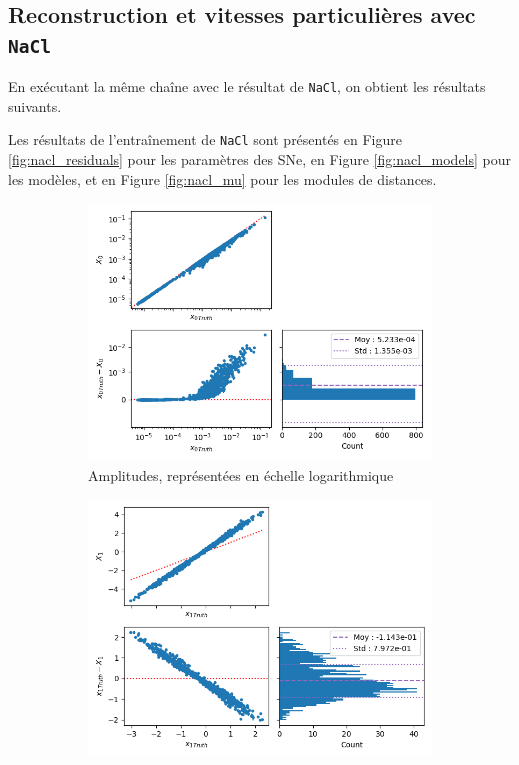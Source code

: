 \documentclass{book}
\def\nacl{\texttt{NaCl}\xspace}
\begin{document}
\subsection{Reconstruction et vitesses particulières avec \nacl}
En exécutant la même chaîne avec le résultat de \nacl, on obtient les résultats suivants.

Les résultats de l'entraînement de \nacl sont présentés en Figure \ref{fig:nacl_residuals} pour les paramètres des SNe, en Figure \ref{fig:nacl_models} pour les modèles, et en Figure \ref{fig:nacl_mu} pour les modules de distances.

\begin{figure}
	\centering
	\begin{subfigure}{0.45\textwidth}
		\centering
		\includegraphics[width=\textwidth]{figures/nacl_x0.png}
		\caption{Amplitudes, représentées en échelle logarithmique}
		\label{fig:nacl_x0}
	\end{subfigure}
	\hfill
	\begin{subfigure}{0.45\textwidth}
		\centering
		\includegraphics[width=\textwidth]{figures/nacl_x1.png}

\end{subfigure}
\end{figure}
\end{document}

